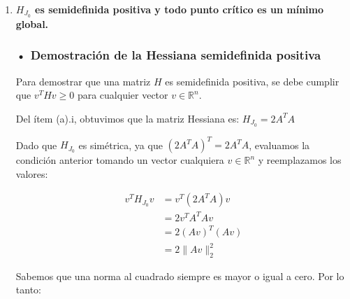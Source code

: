 \documentclass{article}
\begin{document}
\begin{enumerate}[label=\roman*., widest=iii]
  Para demostrar que los puntos críticos de \(J_0(x)\) corresponden a las soluciones de las ecuaciones normales, debemos recordar que un punto crítico de una función es aquel donde su gradiente es igual a cero. Por lo que utilizaremos el gradiente obtenido anteriormente y lo igualaremos a cero:

  \[
  \nabla J_0(x)=2A^T(Ax-b)=0
  \]

  Simplificamos dividiendo por \(2\) y reordenamos los términos:

  \[
  \begin{aligned}
  A^T(Ax-b)&=0\\
  A^TAx-A^Tb&=0\\
  A^TAx&=A^Tb
  \end{aligned}
  \]

  De esta manera, obtenemos la expresión para las ecuaciones normales:

  \[
  \boxed{A^TAx=A^Tb}
  \]

  Por lo tanto, concluimos que si un vector \(x\) es un punto crítico de \(J_0(x)\), entonces necesariamente satisface las ecuaciones normales.

  \bigskip

  \item \textbf{$H_{J_0}$ es semidefinida positiva y todo punto crítico es un mínimo global.}

  \subsubsection*{• Demostración de la Hessiana semidefinida positiva}

  Para demostrar que una matriz \(H\) es semidefinida positiva, se debe cumplir que \(v^THv\geq 0\) para cualquier vector \(v\in\mathbb{R}^n\).

  Del ítem (a).i, obtuvimos que la matriz Hessiana es: \(H_{J_0}=2A^TA\)

  Dado que \(H_{J_0}\) es simétrica, ya que \((2A^TA)^T=2A^TA\), evaluamos la condición anterior tomando un vector cualquiera \(v\in\mathbb{R}^n\) y reemplazamos los valores:

  \[
  \begin{aligned}
  v^TH_{J_0}v
  &=v^T(2A^TA)v\\
  &=2v^TA^TAv\\
  &=2(Av)^T(Av)\\
  &=2\|Av\|_2^2
  \end{aligned}
  \]

  Sabemos que una norma al cuadrado siempre es mayor o igual a cero. Por lo tanto:


\end{enumerate}
\end{document}
